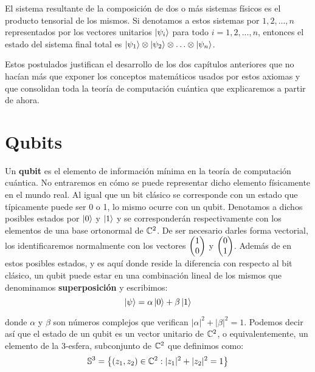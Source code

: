 \begin{postulate} El sistema resultante de la composición de dos o más sistemas físicos es el producto tensorial de los mismos. Si denotamos a estos sistemas por $1,2,...,n$ representados por los vectores unitarios $\left|\psi_i\right\rangle$ para todo $i=1,2,...,n$, entonces el estado del sistema final total es $\left|\psi_1\right\rangle\otimes\left|\psi_2\right\rangle\otimes\hdots\otimes\left|\psi_n\right\rangle$.

Estos postulados justifican el desarrollo de los dos capítulos anteriores que no hacían más que exponer los conceptos matemáticos usados por estos axiomas y que consolidan toda la teoría de computación cuántica que explicaremos a partir de ahora.
\end{postulate}

\section{Qubits}
\label{sec:sec43}

Un \textbf{qubit}  es el elemento de información mínima en la teoría de computación cuántica. No entraremos en cómo se puede representar dicho elemento físicamente en el mundo real. Al igual que un bit clásico se corresponde con un estado que típicamente puede ser 0 o 1, lo mismo ocurre con un qubit. Denotamos a dichos posibles estados por $\left|0\right\rangle$ y $\left|1\right\rangle$ y se corresponderán respectivamente con los elementos de una base ortonormal de $\mathbb{C}^2$. De ser necesario darles forma vectorial, los identificaremos normalmente con los vectores $\begin{pmatrix} 1 \\ 0 \end{pmatrix}$ y $\begin{pmatrix} 0 \\ 1 \end{pmatrix}$. Además de en estos posibles estados, y es aquí donde reside la diferencia con respecto al bit clásico, un qubit puede estar en una combinación lineal de los mismos que denominamos \textbf{superposición} y escribimos:
\[\left|\psi\right\rangle=\alpha\left|0\right\rangle+\beta\left|1\right\rangle\]

donde $\alpha$ y $\beta$ son números complejos que verifican $|\alpha|^2+|\beta|^2=1$. Podemos decir así que el estado de un qubit es un vector unitario de $\mathbb{C}^2$, o equivalentemente, un elemento de la 3-esfera, subconjunto de $\mathbb{C}^2$ que definimos como:
\[\mathbb{S}^3=\left\{ (z_1,z_2)\in\mathbb{C}^2:|z_1|^2+|z_2|^2=1 \right\}\]

